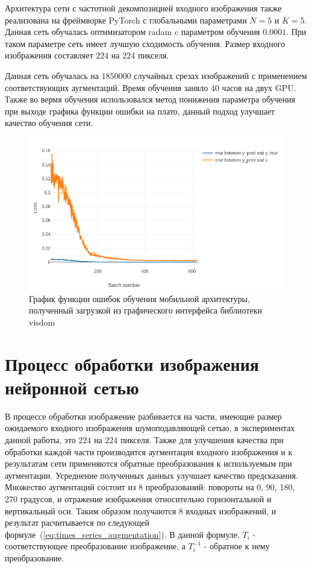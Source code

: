 \documentclass[14pt]{mmcs_article}
\begin{document}
Архитектура сети с частотной декомпозицией входного изображения также реализована на фреймворке PyTorch с глобальными параметрами $N = 5$ и $K = 5$. Данная сеть обучалась оптимизатором radam c параметром обучения $0.0001$. При таком параметре сеть имеет лучшую сходимость обучения. Размер входного изображения составляет $224$ на $224$ пикселя.

Данная сеть обучалась на $1850000$ случайных срезах изображений с применением соответствующих аугментаций. Время обучения заняло 40 часов на двух GPU. Также во вермя обучения использовался метод понижения параметра обучения при выходе графика функции ошибки на плато, данный подход улучшает качество обучения сети.


\begin{figure}[H]
	\centering
	\includegraphics[scale=0.5]{img/simple_net_loss_plot}
	\caption{График функции ошибок обучения мобильной архитектуры, полученный загрузкой из графического интерфейса библиотеки visdom}
	\label{fig:simple_net_loss_plot}
\end{figure}


\section{Процесс обработки изображения нейронной сетью}

В процессе обработки изображение разбивается на части, имеющие размер ожидаемого входного изображения шумоподавляющей сетью, в экспериментах данной работы, это $224$ на $224$ пикселя. Также для улучшения качества при обработки каждой части производится аугментация входного изображения и к результатам сети применяются обратные преобразования к используемым при аугментации. Усреднение полученных данных улучшает качество предсказания. Множество аугментаций состоит из 8 преобразований: повороты на 0, 90, 180, 270 градусов, и отражение изображения относительно горизонтальной и вертикальный оси. Таким образом получаются 8 входных изображений, и результат расчитывается по следующей формуле~(\ref{eq:times_series_augmentation}). В данной формуле, $T_{i}$ - соответствующее преобразование изображение, а $T_{i}^{-1}$ - обратное к нему преобразование.
\end{document}

